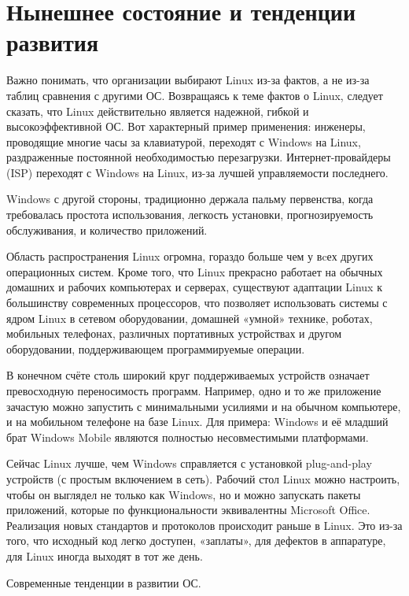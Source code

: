 \section{Нынешнее состояние и тенденции развития}

Важно понимать, что организации выбирают Linux из-за фактов, а не из-за таблиц сравнения с другими ОС. Возвращаясь к теме фактов о Linux, следует сказать, что Linux действительно является надежной, гибкой и высокоэффективной ОС. Вот характерный пример применения: инженеры, проводящие многие часы за клавиатурой, переходят с Windows на Linux, раздраженные постоянной необходимостью перезагрузки. Интернет-провайдеры (ISP) переходят с Windows на Linux, из-за лучшей управляемости последнего.

Windows с другой стороны, традиционно держала пальму первенства, когда требовалась простота использования, легкость установки, прогнозируемость обслуживания, и количество приложений.

Область распространения Linux огромна, гораздо больше чем у вcех других операционных систем. Кроме того, что Linux прекрасно работает на обычных домашних и рабочих компьютерах и серверах, существуют адаптации Linux к большинству современных процессоров, что позволяет использовать системы с ядром Linux в сетевом оборудовании, домашней «умной» технике, роботах, мобильных телефонах, различных портативных устройствах и другом оборудовании, поддерживающем программируемые операции.

В конечном счёте столь широкий круг поддерживаемых устройств означает превосходную переносимость программ. Например, одно и то же приложение зачастую можно запустить с минимальными усилиями и на обычном компьютере, и на мобильном телефоне на базе Linux. Для примера: Windows и её младший брат Windows Mobile являются полностью несовместимыми платформами.

Сейчас Linux лучше, чем Windows справляется с установкой plug-and-play устройств (с простым включением в сеть). Рабочий стол Linux можно настроить, чтобы он выглядел не только как Windows, но и можно запускать пакеты приложений, которые по функциональности эквивалентны Microsoft Office. Реализация новых стандартов и протоколов происходит раньше в Linux. Это из-за того, что исходный код легко доступен, «заплаты», для дефектов в аппаратуре, для Linux иногда выходят в тот же день.

Современные тенденции в развитии ОС.

